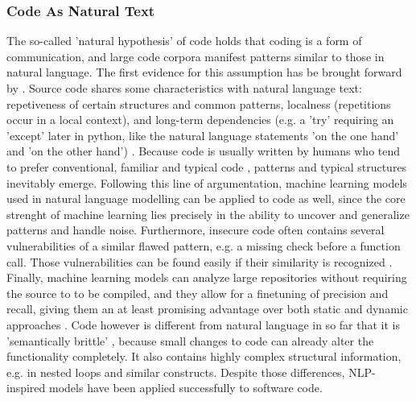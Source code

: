 \documentclass[
	a4paper,
	pagesize,
	pdftex,
	12pt,
	twoside, %
	BCOR=5mm, %
	ngerman,
	fleqn,
	final,
	]{scrartcl}
\begin{document}
\subsubsection{Code As Natural Text}\label{Natural-Hypothesis}\label{Semantically-Brittle}
The so-called 'natural hypothesis' of code holds that coding is a form of communication, and large code corpora manifest patterns similar to those in natural language. The first evidence for this assumption has be brought forward by \cite{Hindle.2012}.
Source code shares some characteristics with natural language text: repetiveness of certain structures and common patterns, localness (repetitions occur in a local context), and long-term dependencies (e.g. a 'try' requiring an 'except' later in python, like the natural language statements 'on the one hand' and 'on the other hand') \cite{Dam.2016}.
Because code is usually written by humans who tend to prefer conventional, familiar and typical code \cite{Allamanis.2018}, patterns and typical structures inevitably emerge. Following this line of argumentation, machine learning models used in natural language modelling can be applied to code as well, since the core strenght of machine learning lies precisely in the ability to uncover and generalize patterns and handle noise. Furthermore, insecure code often contains several vulnerabilities of a similar flawed pattern, e.g. a missing check before a function call. Those vulnerabilities can be found easily if their similarity is recognized \cite{Yamaguchi.2012}. Finally, machine learning models can analyze large repositories without requiring the source to to be compiled, and they allow for a finetuning of precision and recall, giving them an at least promising advantage over both static and dynamic approaches \cite{Russell.2018}.
Code however is different from natural language in so far that it is 'semantically brittle' \cite{Allamanis.2018}, because small changes to code can already alter the functionality completely. It also contains highly complex structural information, e.g. in nested loops and similar constructs. Despite those differences, NLP-inspired models have been applied successfully to software code.
\end{document}

